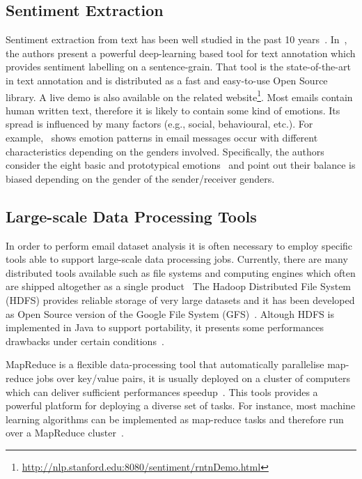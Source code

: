 \documentclass{vldb}
\begin{document}
\subsection{Sentiment Extraction}
Sentiment extraction from text has been well studied in the past 10 years~\cite{aggarwal2012mining, das2007yahoo, bai2004sentiment, gamon2005pulse, bird2009natural}.
In~\cite{manning2014stanford}, the authors present a powerful deep-learning based tool for text annotation which provides sentiment labelling on a sentence-grain.
That tool is the state-of-the-art in text annotation and is distributed as a fast and easy-to-use Open Source library.
A live demo is also available on the related website\footnote{\url{http://nlp.stanford.edu:8080/sentiment/rntnDemo.html}}.
Most emails contain human written text, therefore it is likely to contain some kind of emotions.
Its spread is influenced by many factors (e.g., social, behavioural, etc.).
For example,~\cite{mohammad2011tracking} shows emotion patterns in email messages occur with different characteristics depending on the genders involved.
Specifically, the authors consider the eight basic and prototypical emotions~\cite{plutchik1980emotion} and point out their balance is biased depending on the gender of the sender/receiver genders.


\subsection{Large-scale Data Processing Tools}
In order to perform email dataset analysis it is often necessary to employ specific tools able to support large-scale data processing jobs.
Currently, there are many distributed tools available such as file systems and computing engines which often are shipped altogether as a single product~\cite{shvachko2010hadoop, zaharia2012resilient, meng2015mllib, shoro2015big, dean2008mapreduce, dean2010mapreduce}
The Hadoop Distributed File System (HDFS) provides reliable storage of very large datasets and it has been developed as Open Source version of the Google File System (GFS)~\cite{shvachko2010hadoop, ghemawat2003google}.
Altough HDFS is implemented in Java to support portability, it presents some performances drawbacks under certain conditions~\cite{shafer2010hadoop}.

MapReduce is a flexible data-processing tool that automatically parallelise map-reduce jobs over key/value pairs, it is usually deployed on a cluster of computers which can deliver sufficient performances speedup~\cite{dean2010mapreduce}.
This tools provides a powerful platform for deploying a diverse set of tasks.
For instance, most machine learning algorithms can be implemented as map-reduce tasks and therefore run over a MapReduce cluster~\cite{chu2007map}. 
\end{document}
